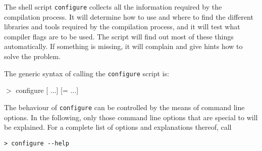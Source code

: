 The shell script \texttt{configure} collects all the information
required by the compilation process. It will determine how to use and
where to find the different libraries and tools required by the
compilation process, and it will test what compiler flags are to be
used.  The script will find out most of these things automatically.
If something is missing, it will complain and give hints how to solve
the problem.

The generic syntax of calling the \texttt{configure} script is:
\begin{syntax}
 $>$ configure [ ...] [= ...]
\end{syntax}

The behaviour of \texttt{configure} can be controlled by the means of
command line options. In the following, only those command line
options that are special to \es{} will be explained.  For a complete
list of options and explanations thereof, call
\begin{verbatim}
> configure --help
\end{verbatim}

